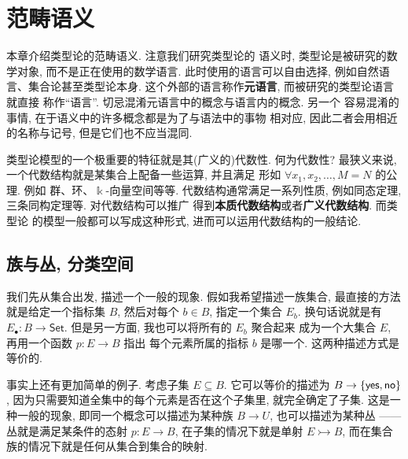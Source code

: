 \chapter{范畴语义}

本章介绍类型论的范畴语义. 注意我们研究类型论的
语义时, 类型论是被研究的数学对象, 而不是正在使用的数学语言.
此时使用的语言可以自由选择, 例如自然语言、集合论甚至类型论本身.
这个外部的语言称作\textbf{元语言}, 而被研究的类型论语言就直接
称作“语言”. 切忌混淆元语言中的概念与语言内的概念. 另一个
容易混淆的事情, 在于语义中的许多概念都是为了与语法中的事物
相对应, 因此二者会用相近的名称与记号, 但是它们也不应当混同.

类型论模型的一个极重要的特征就是其(广义的)代数性. 何为代数性?
最狭义来说, 一个代数结构就是某集合上配备一些运算, 并且满足
形如 \(\forall x_1, x_2, \dots, M = N\) 的公理. 例如
群、环、\(\Bbbk\)-向量空间等等. 代数结构通常满足一系列性质,
例如同态定理, 三条同构定理等. 对代数结构可以推广
得到\textbf{本质代数结构}或者\textbf{广义代数结构}. 而类型论
的模型一般都可以写成这种形式, 进而可以运用代数结构的一般结论.

\section{族与丛, 分类空间}

我们先从集合出发, 描述一个一般的现象.
假如我希望描述一族集合, 最直接的方法就是给定一个指标集 \(B\),
然后对每个 \(b \in B\), 指定一个集合 \(E_b\).
换句话说就是有 \(E_\bullet : B \to \mathsf{Set}\).
但是另一方面, 我也可以将所有的 \(E_b\) 聚合起来
成为一个大集合 \(E\), 再用一个函数 \(p : E \to B\) 指出
每个元素所属的指标 \(b\) 是哪一个. 这两种描述方式是等价的.

\begin{center}
\end{center}

事实上还有更加简单的例子. 考虑子集 \(E \subseteq B\).
它可以等价的描述为 \(B \to \{\textnormal{\textsf{yes}}, \textnormal{\textsf{no}}\}\),
因为只需要知道全集中的每个元素是否在这个子集里, 就完全确定了子集.
这是一种一般的现象, 即同一个概念可以描述为某种族 \(B \to U\),
也可以描述为某种丛 ------ 丛就是满足某条件的态射 \(p : E \to B\),
在子集的情况下就是单射 \(E \rightarrowtail B\),
而在集合族的情况下就是任何从集合到集合的映射.

